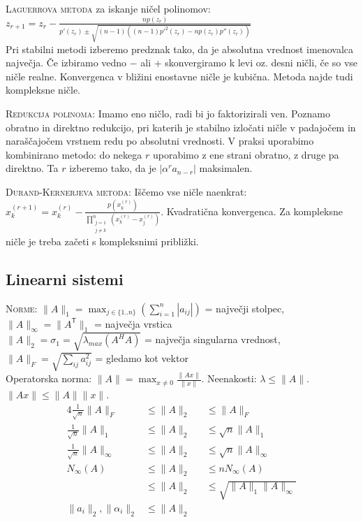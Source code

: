 \documentclass[a4paper,10pt]{article}
\theoremstyle{definition}
\begin{document}
\textsc{Laguerrova metoda} za iskanje ničel polinomov: $z_{r+1} = z_r -
\frac{np(z_r)}{p'(z_r) \pm \sqrt{(n-1)((n-1)p'^2(z_r) - np(z_r)p''(z_r))}}$ \\
Pri stabilni metodi izberemo predznak tako, da je absolutna vrednost imenovalca
največja. Če izbiramo vedno $-$ ali  + skonvergiramo k levi oz. desni ničli, če
so vse ničle realne. Konvergenca v bližini enostavne ničle je kubična. Metoda
najde tudi kompleksne ničle.

\textsc{Redukcija polinoma:} Imamo eno ničlo, radi bi jo faktorizirali ven.
Poznamo obratno in direktno redukcijo, pri katerih je stabilno izločati ničle v
padajočem in naraščajočem vrstnem redu po absolutni vrednosti. V praksi
uporabimo kombinirano metodo: do nekega $r$ uporabimo z ene strani obratno, z
druge pa direktno. Ta $r$ izberemo tako, da je $|\alpha^ra_{n-r}|$ maksimalen.

\textsc{Durand-Kernerjeva metoda:} Iščemo vse ničle naenkrat: $x_k^{(r+1)} =
x_k^{(r)} - \frac{p(x_k^{(r)})}{\prod_{\substack{j=1 \\ j \neq
k}}^n (x_k^{(r)} - x_j^{(r)})}$. Kvadratična konvergenca. Za kompleksne ničle je
treba začeti s kompleksnimi približki.


\subsection*{Linearni sistemi}

\textsc{Norme:} $\|A\|_1 =
\max_{j\in\{1..n\}}\left(\sum_{i=1}^n|a_{ij}|\right)$ = največji stolpec,
$\|A\|_\infty = \|A^\mathsf{T}\|_1$ = največja vrstica \\
$\|A\|_2 = \sigma_1 = \sqrt{\lambda_{max}(A^HA)}$ = največja singularna vrednost,
$\|A\|_F = \sqrt{\sum_{ij}a_{ij}^2}$ = gledamo kot vektor \\
Operatorska norma: $\|A\| = \max_{x\neq 0}\frac{\|Ax\|}{\|x\|}$.
Neenakosti: $\lambda \leq \|A\|$. $\|Ax\| \leq \|A\|\|x\|$.
\begin{alignat*}{4}
\textstyle \frac{1}{\sqrt{n}}\|A\|_F &\leq \|A\|_2 &&\leq \|A\|_F \\
\textstyle \frac{1}{\sqrt{n}}\|A\|_1 &\leq \|A\|_2 &&\leq \sqrt{n} \|A\|_1 \\
\textstyle \frac{1}{\sqrt{n}}\|A\|_\infty &\leq \|A\|_2 &&\leq \sqrt{n} \|A\|_\infty \\
N_\infty(A) &\leq \|A\|_2 &&\leq nN_\infty(A) \\
            &\leq \|A\|_2 &&\leq \sqrt{\|A\|_1\|A\|_\infty} \\
\|a_i\|_2, \|\alpha_i\|_2 &\leq \|A\|_2 &&
\end{alignat*}
\end{document}
